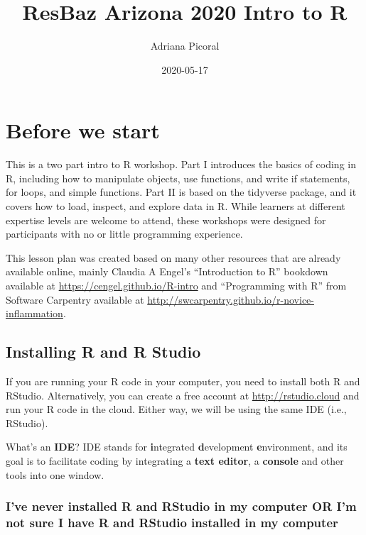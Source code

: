 \documentclass[]{book}
\title{ResBaz Arizona 2020 Intro to R}
\author{Adriana Picoral}
\date{2020-05-17}
\begin{document}
\maketitle

{
\setcounter{tocdepth}{1}
\tableofcontents
}
\hypertarget{before-we-start}{%
\chapter{Before we start}\label{before-we-start}}

This is a two part intro to R workshop. Part I introduces the basics of coding in R, including how to manipulate objects, use functions, and write if statements, for loops, and simple functions. Part II is based on the tidyverse package, and it covers how to load, inspect, and explore data in R. While learners at different expertise levels are welcome to attend, these workshops were designed for participants with no or little programming experience.

This lesson plan was created based on many other resources that are already available online, mainly Claudia A Engel's ``Introduction to R'' bookdown available at \url{https://cengel.github.io/R-intro} and ``Programming with R'' from Software Carpentry available at \url{http://swcarpentry.github.io/r-novice-inflammation}.

\hypertarget{installing-r-and-r-studio}{%
\section{Installing R and R Studio}\label{installing-r-and-r-studio}}

If you are running your R code in your computer, you need to install both R and RStudio. Alternatively, you can create a free account at \url{http://rstudio.cloud} and run your R code in the cloud. Either way, we will be using the same IDE (i.e., RStudio).

\leavevmode\hypertarget{explanation}{}%
What's an \textbf{IDE}? IDE stands for \textbf{i}ntegrated \textbf{d}evelopment \textbf{e}nvironment, and its goal is to facilitate coding by integrating a \textbf{text editor}, a \textbf{console} and other tools into one window.

\hypertarget{ive-never-installed-r-and-rstudio-in-my-computer-or-im-not-sure-i-have-r-and-rstudio-installed-in-my-computer}{%
\subsection{I've never installed R and RStudio in my computer OR I'm not sure I have R and RStudio installed in my computer}\label{ive-never-installed-r-and-rstudio-in-my-computer-or-im-not-sure-i-have-r-and-rstudio-installed-in-my-computer}}
\end{document}
